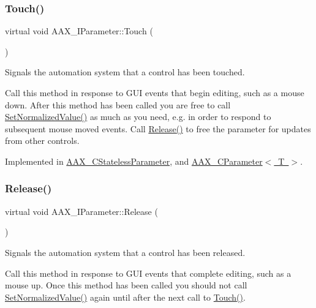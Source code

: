 \subsubsection{\texorpdfstring{Touch()}{Touch()}}
{\footnotesize\ttfamily virtual void A\+A\+X\+\_\+\+I\+Parameter\+::\+Touch (\begin{DoxyParamCaption}{ }\end{DoxyParamCaption})\hspace{0.3cm}{\ttfamily [pure virtual]}}



Signals the automation system that a control has been touched. 

Call this method in response to G\+UI events that begin editing, such as a mouse down. After this method has been called you are free to call \mbox{\hyperlink{a01857_ad4b9a53e4e972d1a840ef094036e5a70}{Set\+Normalized\+Value()}} as much as you need, e.\+g. in order to respond to subsequent mouse moved events. Call \mbox{\hyperlink{a01857_a3d4869d9b6ec03d4f95f33f56479756f}{Release()}} to free the parameter for updates from other controls. 

Implemented in \mbox{\hyperlink{a01541_a91eda962cdbf1e211a396240c23c0330}{A\+A\+X\+\_\+\+C\+Stateless\+Parameter}}, and \mbox{\hyperlink{a01537_afb023dec89c366c2f5667c2a225b1df9}{A\+A\+X\+\_\+\+C\+Parameter$<$ T $>$}}.

\mbox{\label{a01857_a3d4869d9b6ec03d4f95f33f56479756f}} 
\subsubsection{\texorpdfstring{Release()}{Release()}}
{\footnotesize\ttfamily virtual void A\+A\+X\+\_\+\+I\+Parameter\+::\+Release (\begin{DoxyParamCaption}{ }\end{DoxyParamCaption})\hspace{0.3cm}{\ttfamily [pure virtual]}}



Signals the automation system that a control has been released. 

Call this method in response to G\+UI events that complete editing, such as a mouse up. Once this method has been called you should not call \mbox{\hyperlink{a01857_ad4b9a53e4e972d1a840ef094036e5a70}{Set\+Normalized\+Value()}} again until after the next call to \mbox{\hyperlink{a01857_a74c71243313f9d817c8bcb77550969aa}{Touch()}}. 

